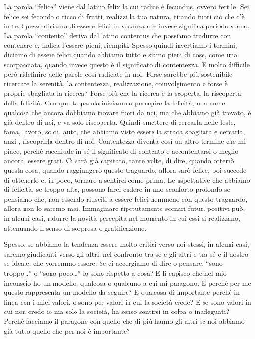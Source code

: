 \documentclass[12pt]{book} %
\begin{document}
La parola “felice” viene dal latino felix la cui radice è fecundus, ovvero fertile. Sei felice sei fecondo o ricco di
frutti, realizzi la tua natura, tirando fuori ciò che c'è in te. Spesso diciamo di essere felici in vacanza che  invece significa periodo vacuo. 
La parola “contento” deriva dal latino contentus che possiamo tradurre con contenere e, indica l'essere pieni, riempiti. Spesso
quindi invertiamo i termini, diciamo di essere felici quando abbiamo tutto e siamo pieni di cose, come una
scorpacciata, quando invece questo è il significato di contentezza. È molto difficile però ridefinire delle parole così
radicate in noi. Forse sarebbe più sostenibile ricercare la serenità, la contentezza, realizzazione, coinvolgimento o forse è proprio sbagliata la
ricerca? Forse più che la ricerca è la scoperta, la riscoperta della felicità. Con questa parola iniziamo a percepire
la felicità, non come qualcosa che ancora dobbiamo trovare fuori da noi, ma che abbiamo già trovato, è già dentro di
noi, e va solo riscoperta. Quindi smettere di cercarla nelle feste, fama, lavoro, soldi, auto, che abbiamo visto essere
la strada sbagliata e cercarla, anzi , riscoprirla dentro di noi. Contentezza diventa così un altro termine che mi
piace, perché racchiude in sé il significato di contento e accontentarsi o meglio ancora, essere grati. Ci sarà già capitato, tante volte, di
dire, quando otterrò questa cosa, quando raggiungerò questo traguardo, allora sarò felice, poi succede di ottenerlo e, in poco, tornare a sentirci come prima. Le aspettative che abbiamo di felicità, se troppo alte, possono farci
cadere in uno sconforto profondo se pensiamo che, non essendo riusciti a essere felici nemmeno con questo
traguardo, allora non lo saremo mai. Immaginare ripetutamente scenari futuri positivi può, in alcuni casi, ridurre la novità percepita nel momento in cui essi si realizzano, attenuando il senso di sorpresa o gratificazione. 

Spesso, se abbiamo la tendenza essere molto critici verso noi stessi, in alcuni casi, saremo giudicanti verso gli altri, nel
confronto tra sé e gli altri e tra sé e il nostro se ideale, che vorremmo essere. Se ci accorgiamo di dire o pensare,
“sono troppo…” o “sono poco…” lo sono rispetto a cosa? E li capisco che nel mio inconscio ho un modello, qualcosa o
qualcuno a cui mi paragono. E perché per me questo rappresenta un modello da seguire? E qualcosa di importante perché
in linea con i miei valori, o sono per valori in cui la società crede? E se sono valori in cui non credo io ma solo la
società, ha senso sentirsi in colpa o inadeguati? Perché facciamo il paragone con quello che di più hanno gli altri se
noi abbiamo già tutto quello che per noi è importante?
\end{document}

